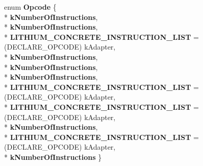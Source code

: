 \begin{DoxyCompactItemize}
\item 
enum {\bfseries Opcode} \{ \\*
{\bfseries k\+Number\+Of\+Instructions}, 
\\*
{\bfseries k\+Number\+Of\+Instructions}, 
\\*
{\bfseries L\+I\+T\+H\+I\+U\+M\+\_\+\+C\+O\+N\+C\+R\+E\+T\+E\+\_\+\+I\+N\+S\+T\+R\+U\+C\+T\+I\+O\+N\+\_\+\+L\+I\+ST} =(D\+E\+C\+L\+A\+R\+E\+\_\+\+O\+P\+C\+O\+DE) k\+Adapter, 
\\*
{\bfseries k\+Number\+Of\+Instructions}, 
\\*
{\bfseries k\+Number\+Of\+Instructions}, 
\\*
{\bfseries k\+Number\+Of\+Instructions}, 
\\*
{\bfseries L\+I\+T\+H\+I\+U\+M\+\_\+\+C\+O\+N\+C\+R\+E\+T\+E\+\_\+\+I\+N\+S\+T\+R\+U\+C\+T\+I\+O\+N\+\_\+\+L\+I\+ST} =(D\+E\+C\+L\+A\+R\+E\+\_\+\+O\+P\+C\+O\+DE) k\+Adapter, 
\\*
{\bfseries L\+I\+T\+H\+I\+U\+M\+\_\+\+C\+O\+N\+C\+R\+E\+T\+E\+\_\+\+I\+N\+S\+T\+R\+U\+C\+T\+I\+O\+N\+\_\+\+L\+I\+ST} =(D\+E\+C\+L\+A\+R\+E\+\_\+\+O\+P\+C\+O\+DE) k\+Adapter, 
\\*
{\bfseries k\+Number\+Of\+Instructions}, 
\\*
{\bfseries L\+I\+T\+H\+I\+U\+M\+\_\+\+C\+O\+N\+C\+R\+E\+T\+E\+\_\+\+I\+N\+S\+T\+R\+U\+C\+T\+I\+O\+N\+\_\+\+L\+I\+ST} =(D\+E\+C\+L\+A\+R\+E\+\_\+\+O\+P\+C\+O\+DE) k\+Adapter, 
\\*
{\bfseries k\+Number\+Of\+Instructions}
 \}\hypertarget{classv8_1_1internal_1_1_l_instruction_a5fface668216c981c65cddd0c9feb0de}{}\label{classv8_1_1internal_1_1_l_instruction_a5fface668216c981c65cddd0c9feb0de}


\end{DoxyCompactItemize}
